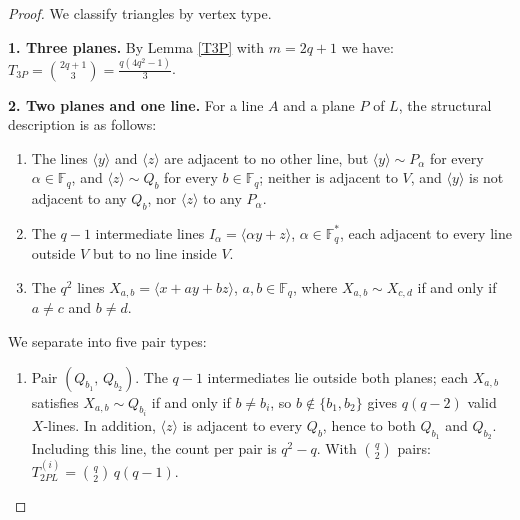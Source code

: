 \documentclass[10pt,a4paper]{amsart}
\begin{document}
\begin{proof}
We classify triangles by vertex type.

\medskip
\noindent\textbf{1. Three planes.} By Lemma \ref{T3P} with $m=2q+1$ we have: $T_{3P}= \binom{2q+1}{3} =\frac{q(4q^2-1)}{3}$.

\smallskip
\noindent\textbf{2. Two planes and one line.}
For a line $A$ and a plane $P$ of $L$,  the structural description is as follows:

\begin{enumerate}
\item[(1)] The lines $\langle y \rangle$ and $\langle z \rangle$ are adjacent
to no other line, but $\langle y \rangle \sim P_\alpha$ for every
$\alpha \in \mathbb F_q$, and $\langle z \rangle \sim Q_b$ for every
$b \in \mathbb F_q$; neither is adjacent to $V$, and $\langle y \rangle$ is
not adjacent to any $Q_b$, nor $\langle z \rangle$ to any $P_\alpha$.
\item[(2)] The $q-1$ intermediate lines $I_\alpha = \langle \alpha y + z
\rangle$, $\alpha \in \mathbb F_q^*$, each adjacent to every line outside
$V$ but to no line inside $V$.
\item[(3)] The $q^2$ lines $X_{a,b} = \langle x + ay + bz \rangle$,
$a,b \in \mathbb F_q$, where $X_{a,b} \sim X_{c,d}$ if and only if $a \neq c$
and $b \neq d$.
\end{enumerate}

We separate into five pair types:
\begin{enumerate}
\item[(i)] Pair $(Q_{b_1},\,Q_{b_2})$. The $q-1$ intermediates lie outside both planes; each $X_{a,b}$ satisfies $X_{a,b}\sim Q_{b_i}$ if and only if $b\neq b_i$, so
$b\notin\{b_1,b_2\}$ gives $q(q-2)$ valid $X$-lines.  In addition, $\langle z \rangle$ is adjacent to
every $Q_b$, hence to both $Q_{b_1}$ and $Q_{b_2}$. Including this line, the count per pair is $q^2-q$. With
$\binom{q}{2}$ pairs: $T_{2PL}^{(i)} = \binom{q}{2}\,q(q-1)$.



\end{enumerate}
\end{proof}
\end{document}
